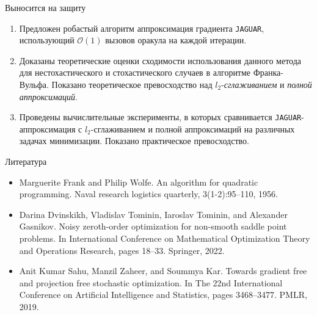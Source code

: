 \documentclass{beamer}
\begin{document}

\begin{frame}{Выносится на защиту}

    \begin{enumerate}
        \item Предложен робастый алгоритм аппроксимация градиента \texttt{JAGUAR}, использующий $\mathcal{O}(1)$ вызовов оракула на каждой итерации.
        \item Доказаны теоретические оценки сходимости использования данного метода для нестохастического и стохастического случаев в алгоритме Франка-Вульфа. Показано теоретическое превосходство над $l_2$-\textit{сглаживанием} и \textit{полной аппроксимаций}. 
        \item Проведены вычислительные эксперименты, в которых сравнивается \texttt{JAGUAR}-аппроксимация с $l_2$-сглаживанием и полной аппроксимаций на различных задачах минимизации. Показано практическое превосходство.
    \end{enumerate}

\end{frame}


\begin{frame}{Литература}
    \begin{itemize}
        \item Marguerite Frank and Philip Wolfe. An algorithm for quadratic programming. Naval research logistics quarterly, 3(1-2):95–110, 1956.
        \item Darina Dvinskikh, Vladislav Tominin, Iaroslav Tominin, and Alexander Gasnikov. Noisy zeroth-order optimization for non-smooth saddle point problems. In International Conference on Mathematical Optimization Theory and Operations Research, pages 18–33. Springer, 2022.
        \item Anit Kumar Sahu, Manzil Zaheer, and Soummya Kar. Towards gradient free and projection free stochastic optimization. In The 22nd International Conference on Artificial Intelligence and Statistics, pages 3468–3477. PMLR, 2019.
    \end{itemize}

\end{frame}

\end{document}
